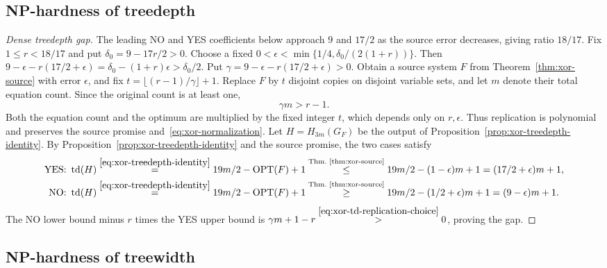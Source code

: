 \subsection{NP-hardness of treedepth}
\label{app:dense-np-td}

\begin{proof}[Dense treedepth gap]
The leading NO and YES coefficients below approach $9$ and $17/2$
as the source error decreases, giving ratio $18/17$.
Fix $1\le r<18/17$ and put $\delta_0=9-17r/2>0$.
Choose a fixed
$0<\epsilon<\min\{1/4,\delta_0/(2(1+r))\}$.
Then $9-\epsilon-r(17/2+\epsilon)
=\delta_0-(1+r)\epsilon>\delta_0/2$.
Put $\gamma=9-\epsilon-r(17/2+\epsilon)>0$. Obtain a source system
$F$ from Theorem~\ref{thm:xor-source} with error $\epsilon$, and fix
$t=\lfloor(r-1)/\gamma\rfloor+1$. Replace $F$ by $t$ disjoint
copies on disjoint variable sets, and let $m$ denote their total
equation count. Since the original count is at least one,
\begin{equation}\label{eq:xor-td-replication-choice}
 \gamma m>r-1.
\end{equation}
Both the equation count and the optimum are multiplied by the fixed
integer $t$, which depends only on $r,\epsilon$. Thus replication
is polynomial and preserves the source promise and~\eqref{eq:xor-normalization}.
Let $H=H_{3m}(G_F)$ be the output of
Proposition~\ref{prop:xor-treedepth-identity}.
By Proposition~\ref{prop:xor-treedepth-identity} and the source
promise, the two cases satisfy
\[
\begin{aligned}
\textup{YES: }\operatorname{td}(H)
 &\overset{\eqref{eq:xor-treedepth-identity}}{=}
   19m/2-\operatorname{OPT}(F)+1
  \overset{\text{Thm.~\ref{thm:xor-source}}}{\le}
   19m/2-(1-\epsilon)m+1
   =(17/2+\epsilon)m+1,\\
\textup{NO: }\operatorname{td}(H)
 &\overset{\eqref{eq:xor-treedepth-identity}}{=}
   19m/2-\operatorname{OPT}(F)+1
  \overset{\text{Thm.~\ref{thm:xor-source}}}{\ge}
   19m/2-(1/2+\epsilon)m+1
   =(9-\epsilon)m+1.\end{aligned}
\]
The NO lower bound minus $r$ times the YES upper bound is
$\gamma m+1-r\overset{\eqref{eq:xor-td-replication-choice}}{>}0$,
proving the gap.
\end{proof}

\subsection{NP-hardness of treewidth}
\label{app:dense-np-tw}

